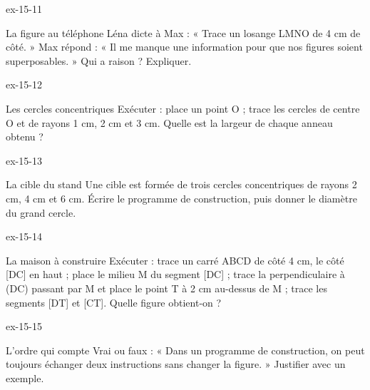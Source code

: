 \begin{blocLivre}{ex-15-11}\begin{exercice}[3]{La figure au téléphone}
Léna dicte à Max : « Trace un losange LMNO de 4 cm de côté. » Max répond : « Il me manque une information pour que nos figures soient superposables. » Qui a raison ? Expliquer.
\label{fig-ex-15-11}
\end{exercice}\end{blocLivre}
\begin{blocLivre}{ex-15-12}\begin{exercice}[3]{Les cercles concentriques}
Exécuter : place un point O ; trace les cercles de centre O et de rayons 1 cm, 2 cm et 3 cm. Quelle est la largeur de chaque anneau obtenu ?
\label{fig-ex-15-12}
\end{exercice}\end{blocLivre}
\begin{blocLivre}{ex-15-13}\begin{exercice}[3]{La cible du stand}
Une cible est formée de trois cercles concentriques de rayons 2 cm, 4 cm et 6 cm. Écrire le programme de construction, puis donner le diamètre du grand cercle.
\label{fig-ex-15-13}
\end{exercice}\end{blocLivre}
\begin{blocLivre}{ex-15-14}\begin{exercice}[3]{La maison à construire}
Exécuter : trace un carré ABCD de côté 4 cm, le côté [DC] en haut ; place le milieu M du segment [DC] ; trace la perpendiculaire à (DC) passant par M et place le point T à 2 cm au-dessus de M ; trace les segments [DT] et [CT]. Quelle figure obtient-on ?
\label{fig-ex-15-14}
\end{exercice}\end{blocLivre}
\begin{blocLivre}{ex-15-15}\begin{exercice}[3]{L’ordre qui compte}
Vrai ou faux : « Dans un programme de construction, on peut toujours échanger deux instructions sans changer la figure. » Justifier avec un exemple.
\label{fig-ex-15-15}
\end{exercice}\end{blocLivre}

\clearpage

